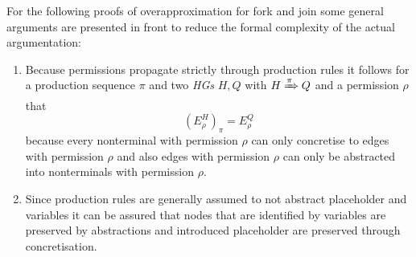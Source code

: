 	For the following proofs of overapproximation for fork and join some general
	arguments are presented in front to reduce the formal complexity of the
	actual argumentation:
	\begin{enumerate}[label=(\Roman*)]
		\item \label{arg:strictpropagation}
			Because permissions propagate
			strictly through production rules it follows for a production sequence
			$\pi$ and two \emph{\acp{HG}} $H,Q$ with $H\xRightarrow{\pi} Q$ and a
			permission $\rho$ that
			\begin{equation*}
				(E^H_{\rho})_{\pi} = E^{Q}_{\rho}
			\end{equation*}
			because every nonterminal with permission $\rho$ can only concretise
			to edges with permission $\rho$ and also edges with permission $\rho$
			can only be abstracted into nonterminals with permission $\rho$.
		\item \label{arg:preservation}
			Since production rules are generally
			assumed to not abstract placeholder and variables it can be assured
			that nodes that are identified by variables are preserved by
			abstractions and introduced placeholder are preserved through
			concretisation.
	\end{enumerate}

